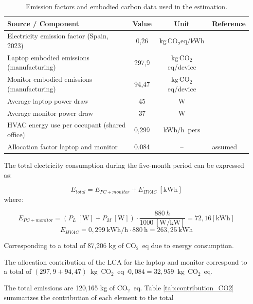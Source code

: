 \begin{table}[H]
\centering
\caption{Emission factors and embodied carbon data used in the estimation.}
\label{tab:co2_inputs_full}
\renewcommand{\arraystretch}{1.15}
\small
\begin{tabular}{|l|c|c|l|}
\hline
\textbf{Source / Component} & \textbf{Value} & \textbf{Unit} & \textbf{Reference} \\ 
\hline
Electricity emission factor (Spain, 2023) & 0,26 & kg\,CO$_2$eq/kWh & \cite{Gencat2023FactorsEmissio} \\ 
Laptop embodied emissions (manufacturing) & 297,9 & kg\,CO$_2$eq/device & \cite{CircularComputing2022} \\ 
Monitor embodied emissions (manufacturing) & 94,47 & kg\,CO$_2$eq/device & \cite{HP2021MonitorLCA} \\ 
Average laptop power draw & 45 & W & \cite{AsusVivabook} \\ 
Average monitor power draw & 37 & W & \cite{AOC} \\ 
HVAC energy use per occupant (shared office) & 0,299 & kWh/h~pers & \cite{ICAEN} \\ 
Allocation factor laptop and monitor & 0.084 & -- & assumed \\ 
\hline
\end{tabular}
\end{table}

The total electricity consumption during the five-month period can be expressed as:

\begin{equation}
E_{total} = E_{PC+monitor}  + E_{HVAC}~[\text{kWh}]
\end{equation}
where:

\begin{equation}
E_{PC+monitor} = (P_L~[\text{W}] + P_M ~[\text{W}]) \cdot  \frac{880~h}{1000~[\text{W/kW}]} = 72,16 [\text{kWh}]
\end{equation}
\begin{equation}
E_{HVAC} = 0,299~\text{kWh/h} \cdot 880~\text{h} = 263,25~\text{kWh}
\end{equation}

Corresponding to a total of 87,206 kg of CO$_2$~eq due to energy consumption.

The allocation contribution of the LCA for the laptop and monitor correspond to a total of $(297,9 + 94,47)$~kg~CO$_2$~eq $\cdot 0,084 = 32,959$~kg~CO$_2$~eq.

The total emissions are 120,165 kg of CO$_2$~eq. Table \ref{tab:contribution_CO2} summarizes the contribution of each element to the total 

